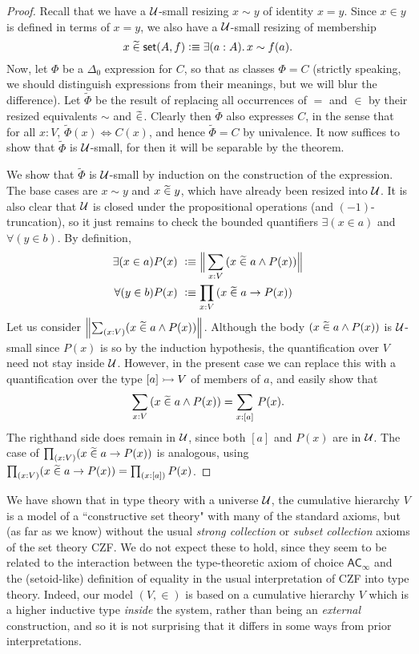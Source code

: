 \begin{proof}
Recall that we have a $\mathcal{U}$-small resizing $x\sim y$ of identity $x = y$. Since $x\in y$ is defined in terms of $x=y$, we also have a $\mathcal{U}$-small resizing of membership
%
\begin{equation*}
  x\bin\vset(A,f) \defeq \exis{a:A} x\sim f(a).
\end{equation*}
%
Now, let $\Phi$ be a $\Delta_0$ expression for $C$, so that as classes $\Phi = C$ (strictly speaking, we should distinguish expressions from their meanings, but we will blur the difference). Let $\widetilde{\Phi}$ be the result of replacing all occurrences of $=$ and $\in$ by their resized equivalents $\sim$ and $\mathrel{\widetilde{\in}}$.  Clearly then $\widetilde{\Phi}$ also expresses $C$, in the sense that for all $x:V$, $\widetilde{\Phi}(x) \Leftrightarrow C(x)$, and hence $\widetilde{\Phi}=C$ by univalence.  It now suffices to show that $\widetilde{\Phi}$ is $\mathcal{U}$-small, for then it will be separable by the theorem.  

We show that  $\widetilde{\Phi}$ is $\mathcal{U}$-small by induction on the construction of the expression.  The base cases are $x\sim y$ and $x\mathrel{\widetilde{\in}} y$, which have already been resized into $\mathcal{U}$.  It is also clear that $\mathcal{U}$ is closed under the propositional operations (and $(-1)$-truncation), so it just remains to check the bounded quantifiers $\exists(x\in a)$ and $\forall(y\in b)$.  By definition,  
\begin{align*}
\exists(x\in a) P(x)\ &\defeq \Brck {\sm{x:V}(x\bin a \land P(x))}\\
\forall(y\in b) P(x)\ &\defeq  \prd{x:V}(x\bin a \to P(x))
\end{align*} 
Let us consider $\brck {\sm{x:V}(x\bin a \land P(x))}$.  Although the body $(x\mathrel{\widetilde{\in}} a \land P(x))$ is $\mathcal{U}$-small since $P(x)$ is so by the induction hypothesis, the quantification over $V$ need not stay inside $\mathcal{U}$.  However, in the present case we can replace this with a quantification over the type $[a]\rightarrowtail V$ of members of $a$, and easily show that
\begin{equation*}
  \sm{x:V}(x\bin a \land P(x)) = \sm{x:[a]} P(x).
\end{equation*}
The righthand side does remain in $\mathcal{U}$, since both $[a]$ and $P(x)$ are in $\mathcal{U}$.  The case of $\prd{x:V}(x\bin a \to P(x))$ is analogous, using $\prd{x:V}(x\bin a \to P(x)) = \prd{x:[a]}P(x)$.
\end{proof}

We have shown that in type theory with a universe $\mathcal{U}$, the cumulative hierarchy $V$ is a model of a ``constructive set theory" with many of the standard axioms, but (as far as we know) without the usual \emph{strong collection} or \emph{subset collection} axioms of the set theory CZF.  We do not expect these to hold, since they seem to be related to the interaction between the type-theoretic axiom of choice $\mathsf{AC}_\infty$ and the (setoid-like) definition of equality in the usual interpretation of CZF into type theory.  Indeed, our model $(V,\in)$ is based on a cumulative hierarchy $V$ which is a higher inductive type \emph{inside} the system, rather than being an \emph{external} construction, and so it is not surprising that it differs in some ways from prior interpretations.

